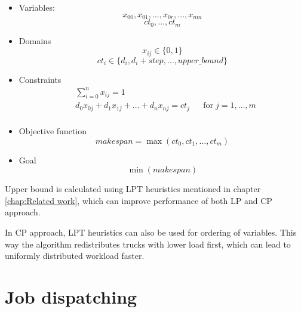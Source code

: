 \documentclass{ctuthesis}
\begin{document}
\begin{itemize}
    \item Variables:\\
    \begin{equation}
        x_{00}, x_{01}, \ldots, x_{0r}, \ldots, x_{nm}
    \end{equation}
    \begin{equation}
        ct_0, \ldots, ct_m
    \end{equation}
    \item Domains\\
    \begin{equation}
    x_{ij} \in \{0, 1\}
    \end{equation}
    \begin{equation}
    ct_{i} \in \{ d_i, d_i + step, \ldots, upper\_bound\}
    \end{equation}
    \item Constraints
    \begin{equation}
    \begin{aligned}
    & \sum_{i=0}^{n} x_{ij} = 1 &&\\
    & d_0x_{0j} + d_1x_{1j} + \ldots + d_nx_{nj} = ct_j && \text{for}\; j = 1, \ldots, m\\
    \end{aligned}
    \end{equation}
    \item Objective function\\
    \begin{equation}
        makespan = \max(ct_0, ct_1, \ldots, ct_m)
    \end{equation}
    \item Goal\\
    \begin{equation}
        \min(makespan)
    \end{equation}
\end{itemize}

Upper bound is calculated using LPT heuristics mentioned in chapter \ref{chap:Related work}, which can improve performance of both LP and CP approach. 

In CP approach, LPT heuristics can also be used for ordering of variables. This way the algorithm redistributes trucks with lower load first, which can lead to uniformly distributed workload faster.


\section{Job dispatching}
\end{document}
